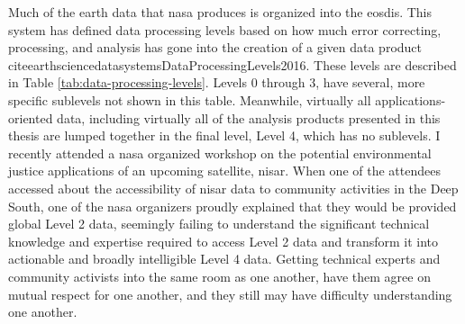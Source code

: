 Much of the earth data that \ac{nasa} produces is organized into the \ac{eosdis}. This system has defined data processing levels based on how much error correcting, processing, and analysis has gone into the creation of a given data product \\cite{earthsciencedatasystemsDataProcessingLevels2016}. These levels are described in Table \ref{tab:data-processing-levels}. Levels 0 through 3, have several, more specific sublevels not shown in this table. Meanwhile, virtually all applications-oriented data, including virtually all of the analysis products presented in this thesis are lumped together in the final level, Level 4, which has no sublevels. I recently attended a \ac{nasa} organized workshop on the potential environmental justice applications of an upcoming satellite, \ac{nisar}. When one of the attendees accessed about the accessibility of \ac{nisar} data to community activities in the Deep South, one of the \ac{nasa} organizers proudly explained that they would be provided global Level 2 data, seemingly failing to understand the significant technical knowledge and expertise required to access Level 2 data and transform it into actionable and broadly intelligible Level 4 data. Getting technical experts and community activists into the same room as one another, have them agree on mutual respect for one another, and they still may have difficulty understanding one another.

